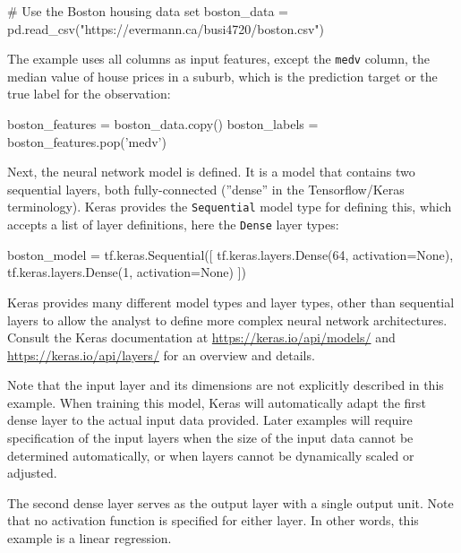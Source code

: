 \begin{samepage}
\begin{pythoncode}
# Use the Boston housing data set
boston_data = pd.read_csv("https://evermann.ca/busi4720/boston.csv")
\end{pythoncode}
\end{samepage}

The example uses all columns as input features, except the \texttt{medv} column, the median value of house prices in a suburb, which is the prediction target or the true label for the observation:

\begin{samepage}
\begin{pythoncode}
boston_features = boston_data.copy()
boston_labels = boston_features.pop('medv')
\end{pythoncode}
\end{samepage}

Next, the neural network model is defined. It is a model that contains two sequential layers, both fully-connected (''dense'' in the Tensorflow/Keras terminology). Keras provides the \texttt{Sequential} model type for defining this, which accepts a list of layer definitions, here the \texttt{Dense} layer types:

\begin{samepage}
\begin{pythoncode}
boston_model = tf.keras.Sequential([
  tf.keras.layers.Dense(64, activation=None),
  tf.keras.layers.Dense(1, activation=None)
])
\end{pythoncode}
\end{samepage}

Keras provides many different model types and layer types, other than sequential layers to allow the analyst to define more complex neural network architectures. Consult the Keras documentation at \url{https://keras.io/api/models/} and \url{https://keras.io/api/layers/} for an overview and details.

Note that the input layer and its dimensions are not explicitly described in this example. When training this model, Keras will automatically adapt the first dense layer to the actual input data provided. Later examples will require specification of the input layers when the size of the input data cannot be determined automatically, or when layers cannot be dynamically scaled or adjusted. 

The second dense layer serves as the output layer with a single output unit. Note that no activation function is specified for either layer. In other words, this example is a linear regression.


